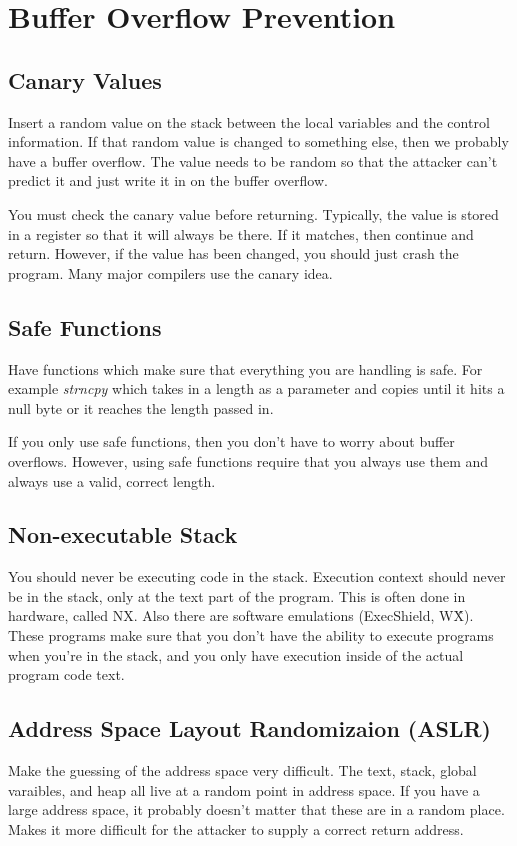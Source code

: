 \documentclass[psamsfonts]{amsart}
\begin{document}
\section{Buffer Overflow Prevention}

\subsection{Canary Values}

Insert a random value on the stack between the local variables and the control information. If that random value is changed to something else, then we probably have a buffer overflow. The value needs to be random so that the attacker can't predict it and just write it in on the buffer overflow.

You must check the canary value before returning. Typically, the value is stored in a register so that it will always be there. If it matches, then continue and return. However, if the value has been changed, you should just crash the program. Many major compilers use the canary idea.

\subsection{Safe Functions}

Have functions which make sure that everything you are handling is safe. For example \emph{strncpy} which takes in a length as a parameter and copies until it hits a null byte or it reaches the length passed in.

If you only use safe functions, then you don't have to worry about buffer overflows. However, using safe functions require that you always use them and always use a valid, correct length.

\subsection{Non-executable Stack}

You should never be executing code in the stack. Execution context should never be in the stack, only at the text part of the program. This is often done in hardware, called NX. Also there are software emulations (ExecShield, W\^X). These programs make sure that you don't have the ability to execute programs when you're in the stack, and you only have execution inside of the actual program code text.

\subsection{Address Space Layout Randomizaion (ASLR)}

Make the guessing of the address space very difficult. The text, stack, global varaibles, and heap all live at a random point in address space. If you have a large address space, it probably doesn't matter that these are in a random place. Makes it more difficult for the attacker to supply a correct return address.
\end{document}

